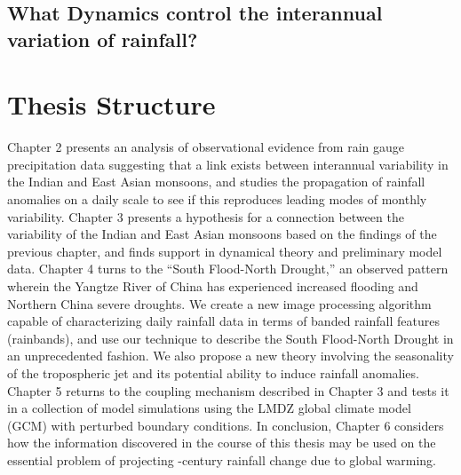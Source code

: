 \subsection{What Dynamics control the interannual variation of rainfall?}

\section{Thesis Structure}

Chapter 2 presents an analysis of observational evidence from rain gauge precipitation data suggesting that a link exists between interannual variability in the Indian and East Asian monsoons, and studies the propagation of rainfall anomalies on a daily scale to see if this reproduces leading modes of monthly variability. Chapter 3 presents a hypothesis for a connection between the variability of the Indian and East Asian monsoons based on the findings of the previous chapter, and finds support in dynamical theory and preliminary model data. Chapter 4 turns to the ``South Flood-North Drought,'' an observed pattern wherein the Yangtze River of China has experienced increased flooding and Northern China severe droughts. We create a new image processing algorithm capable of characterizing daily rainfall data in terms of banded rainfall features (rainbands), and use our technique to describe the South Flood-North Drought in an unprecedented fashion. We also propose a new theory involving the seasonality of the tropospheric jet and its potential ability to induce rainfall anomalies. Chapter 5 returns to the coupling mechanism described in Chapter 3 and tests it in a collection of model simulations using the LMDZ global climate model (GCM) with perturbed boundary conditions. In conclusion, Chapter 6 considers how the information discovered in the course of this thesis may be used on the essential problem of projecting -century rainfall change due to global warming.